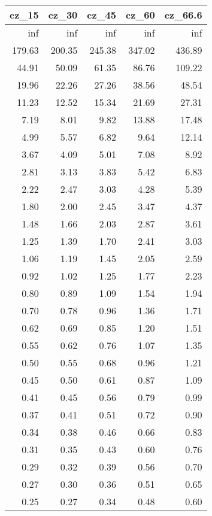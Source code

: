 \begin{tabular}{rrrrr}
\toprule
 cz\_15 &  cz\_30 &  cz\_45 &  cz\_60 &  cz\_66.6 \\
\midrule
   inf &    inf &    inf &    inf &      inf \\
179.63 & 200.35 & 245.38 & 347.02 &   436.89 \\
 44.91 &  50.09 &  61.35 &  86.76 &   109.22 \\
 19.96 &  22.26 &  27.26 &  38.56 &    48.54 \\
 11.23 &  12.52 &  15.34 &  21.69 &    27.31 \\
  7.19 &   8.01 &   9.82 &  13.88 &    17.48 \\
  4.99 &   5.57 &   6.82 &   9.64 &    12.14 \\
  3.67 &   4.09 &   5.01 &   7.08 &     8.92 \\
  2.81 &   3.13 &   3.83 &   5.42 &     6.83 \\
  2.22 &   2.47 &   3.03 &   4.28 &     5.39 \\
  1.80 &   2.00 &   2.45 &   3.47 &     4.37 \\
  1.48 &   1.66 &   2.03 &   2.87 &     3.61 \\
  1.25 &   1.39 &   1.70 &   2.41 &     3.03 \\
  1.06 &   1.19 &   1.45 &   2.05 &     2.59 \\
  0.92 &   1.02 &   1.25 &   1.77 &     2.23 \\
  0.80 &   0.89 &   1.09 &   1.54 &     1.94 \\
  0.70 &   0.78 &   0.96 &   1.36 &     1.71 \\
  0.62 &   0.69 &   0.85 &   1.20 &     1.51 \\
  0.55 &   0.62 &   0.76 &   1.07 &     1.35 \\
  0.50 &   0.55 &   0.68 &   0.96 &     1.21 \\
  0.45 &   0.50 &   0.61 &   0.87 &     1.09 \\
  0.41 &   0.45 &   0.56 &   0.79 &     0.99 \\
  0.37 &   0.41 &   0.51 &   0.72 &     0.90 \\
  0.34 &   0.38 &   0.46 &   0.66 &     0.83 \\
  0.31 &   0.35 &   0.43 &   0.60 &     0.76 \\
  0.29 &   0.32 &   0.39 &   0.56 &     0.70 \\
  0.27 &   0.30 &   0.36 &   0.51 &     0.65 \\
  0.25 &   0.27 &   0.34 &   0.48 &     0.60 \\

\end{tabular}
